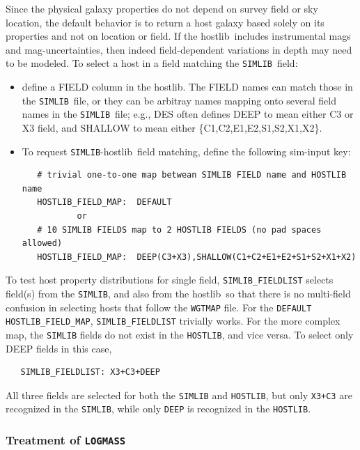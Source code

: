 \documentclass[12pt]{article}
\newcommand{\simlib}{{\tt SIMLIB}}
\newcommand{\hostlib}{{\sc hostlib}}
\begin{document}
{Since the physical galaxy properties do not depend on survey field or sky location,
the default behavior is to return a host galaxy based solely on its properties and
not on location or field. If the \hostlib\ includes instrumental mags and mag-uncertainties,
then indeed field-dependent variations in depth may need to be modeled.
To select a host in a field matching the \simlib\ field:
\begin{itemize}[noitemsep]
  \item define a FIELD column in the \hostlib. The FIELD names can match those in 
        the \simlib\ file, or they can be arbitray names mapping onto several
        field names in the \simlib\ file; e.g., DES often defines DEEP
        to mean either C3 or X3 field, and SHALLOW to mean either \{C1,C2,E1,E2,S1,S2,X1,X2\}.
  \item To request \simlib-\hostlib\ field matching, define the following sim-input key:
    \begin{verbatim}
   # trivial one-to-one map betwean SIMLIB FIELD name and HOSTLIB name
   HOSTLIB_FIELD_MAP:  DEFAULT  
           or
   # 10 SIMLIB FIELDS map to 2 HOSTLIB FIELDS (no pad spaces allowed)
   HOSTLIB_FIELD_MAP:  DEEP(C3+X3),SHALLOW(C1+C2+E1+E2+S1+S2+X1+X2)  
    \end{verbatim}
\end{itemize}
%
To test host property distributions for single field, \verb|SIMLIB_FIELDLIST| 
selects field(s) from the \simlib, and also from the \hostlib\ so that there
is no multi-field confusion in selecting hosts that follow the {\tt WGTMAP} file.
For the \verb|DEFAULT| \verb|HOSTLIB_FIELD_MAP|, \verb|SIMLIB_FIELDLIST| trivially works. 
For the more complex map, the \verb|SIMLIB| fields do not exist in the \verb|HOSTLIB|, 
and vice versa. To select only DEEP fields in this case,
\begin{verbatim}
   SIMLIB_FIELDLIST: X3+C3+DEEP
\end{verbatim}
%
All three fields are selected for both the \verb|SIMLIB| and \verb|HOSTLIB|,
but only {\tt X3+C3} are recognized in the \verb|SIMLIB|,
while only {\tt DEEP} is recognized in the \verb|HOSTLIB|.

\subsubsection{Treatment of {\tt LOGMASS} }
\label{sss:hostlib_logmass}

}
\end{document}
